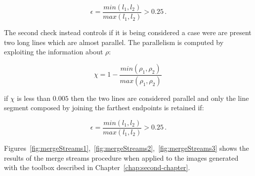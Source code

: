\begin{equation}
  \epsilon = \frac{min(l_1,l_2)}{max(l_1,l_2)} > 0.25 \,.
\end{equation}

The second check instead controls if it is being considered a case were are present two long lines which are almost parallel. The parallelism is computed by exploiting the information about $\rho$:

\begin{equation}
  \chi = 1 - \frac{min(\rho_1,\rho_2)}{max(\rho_1,\rho_2)} \,
\end{equation}

if $\chi$ is less than $0.005$ then the two lines are considered parallel and only the line segment composed by joining the farthest endpoints is retained if:

\begin{equation}
  \epsilon = \frac{min(l_1,l_2)}{max(l_1,l_2)} > 0.25 \,.
\end{equation}

Figures~\ref{fig:mergeStreams1},~\ref{fig:mergeStreams2},~\ref{fig:mergeStreams3} shows the results of the merge streams procedure when applied to the images generated with the toolbox described in Chapter~\ref{chap:second-chapter}.

